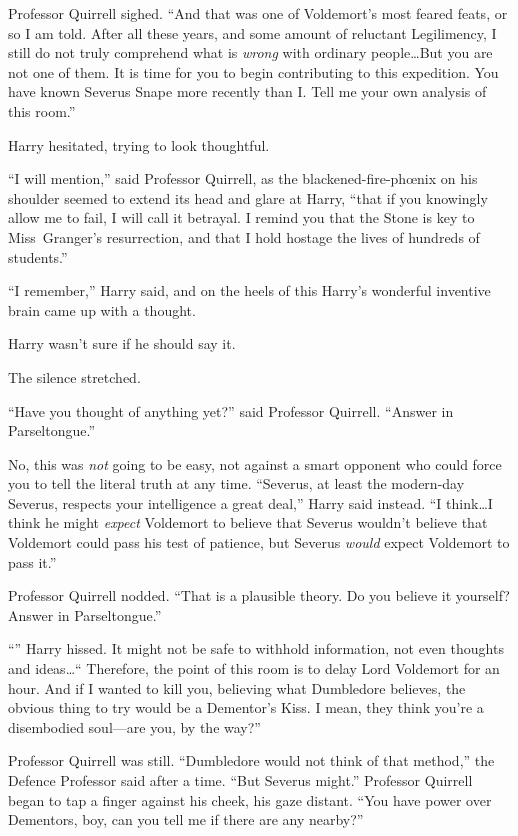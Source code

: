 Professor Quirrell sighed. “And that was one of Voldemort’s most feared feats, or so I am told. After all these years, and some amount of reluctant Legilimency, I still do not truly comprehend what is \emph{wrong} with ordinary people…But you are not one of them. It is time for you to begin contributing to this expedition. You have known Severus Snape more recently than I\@. Tell me your own analysis of this room.”

Harry hesitated, trying to look thoughtful.

“I will mention,” said Professor Quirrell, as the blackened-fire-phœnix on his shoulder seemed to extend its head and glare at Harry, “that if you knowingly allow me to fail, I will call it betrayal. I remind you that the Stone is key to Miss~Granger’s resurrection, and that I hold hostage the lives of hundreds of students.”

“I remember,” Harry said, and on the heels of this Harry’s wonderful inventive brain came up with a thought.

Harry wasn’t sure if he should say it.

The silence stretched.

“Have you thought of anything yet?” said Professor Quirrell. “Answer in Parseltongue.”

No, this was \emph{not} going to be easy, not against a smart opponent who could force you to tell the literal truth at any time. “Severus, at least the modern-day Severus, respects your intelligence a great deal,” Harry said instead. “I think…I think he might \emph{expect} Voldemort to believe that Severus wouldn’t believe that Voldemort could pass his test of patience, but Severus \emph{would} expect Voldemort to pass it.”

Professor Quirrell nodded. “That is a plausible theory. Do you believe it yourself? Answer in Parseltongue.”

“” Harry hissed. It might not be safe to withhold information, not even thoughts and ideas…“ Therefore, the point of this room is to delay Lord Voldemort for an hour. And if I wanted to kill you, believing what Dumbledore believes, the obvious thing to try would be a Dementor’s Kiss. I mean, they think you’re a disembodied soul—are you, by the way?”

Professor Quirrell was still. “Dumbledore would not think of that method,” the Defence Professor said after a time. “But Severus might.” Professor Quirrell began to tap a finger against his cheek, his gaze distant. “You have power over Dementors, boy, can you tell me if there are any nearby?”


